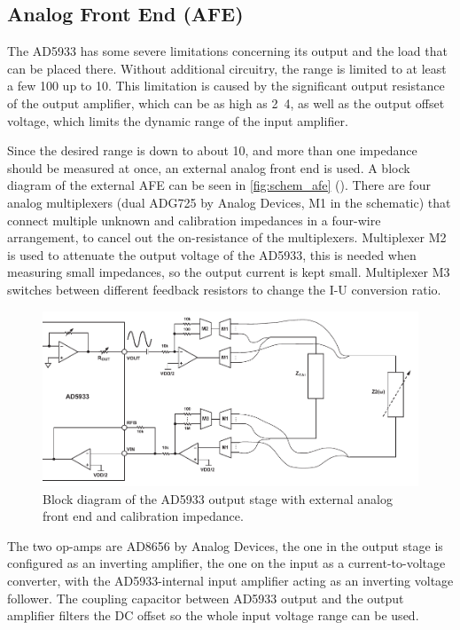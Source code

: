 \subsection{Analog Front End (AFE)}

The AD5933 has some severe limitations concerning its output and the load that can be placed there. Without additional
circuitry, the range is limited to at least a few \unit{100}{\kilo\ohm} up to \unit{10}{\mega\ohm}.
This limitation is caused by the significant output resistance of the output amplifier, which can be as high as
\unit{2.4}{\kilo\ohm}, as well as the output offset voltage, which limits the dynamic range of the input amplifier.

Since the desired range is down to about \unit{10}{\ohm}, and more than one impedance should be measured at once,
an external analog front end is used.
A block diagram of the external AFE can be seen in \autoref{fig:schem_afe} ().
There are four analog multiplexers (dual ADG725 by Analog Devices, M1 in the schematic) that connect multiple unknown
and calibration impedances in a four-wire arrangement, to cancel out the on-resistance of the multiplexers.
Multiplexer M2 is used to attenuate the output voltage of the AD5933, this is needed when measuring small impedances,
so the output current is kept small.
Multiplexer M3 switches between different feedback resistors to change the I-U conversion ratio.

\begin{figure}[hpb]
  \centering
    \includegraphics[width=\textwidth]{bilder/schem_afe.pdf}
  \caption{Block diagram of the AD5933 output stage with external analog front end and calibration impedance.}
  \label{fig:schem_afe}
\end{figure}

The two op-amps are AD8656 by Analog Devices, the one in the output stage is configured as an inverting amplifier,
the one on the input as a current-to-voltage converter, with the AD5933-internal input amplifier acting as an inverting
voltage follower. The coupling capacitor between AD5933 output and the output amplifier filters the DC offset so the
whole input voltage range can be used.

